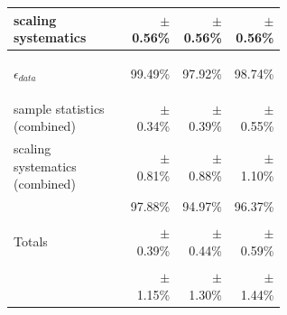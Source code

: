 \documentclass[landscape]{article}
\begin{document}
\begin{center}
\begin{tabular}{p{0.6\linewidth} r r r r}
    scaling systematics & & $\pm$ 0.56\% & $\pm$ 0.56\% & $\pm$ 0.56\% \\\hline
    \begin{minipage}{\linewidth} \begin{center} $\epsilon_{data}$ \end{center} \end{minipage} & & 99.49\% & 97.92\% & 98.74\% \\
    sample statistics (combined) & & $\pm$ 0.34\% & $\pm$ 0.39\% & $\pm$ 0.55\% \\
    scaling systematics (combined) & & $\pm$ 0.81\% & $\pm$ 0.88\% & $\pm$ 1.10\% \\\hline\hline
    & & 97.88\% & 94.97\% & 96.37\% \\
    \begin{minipage}{\linewidth} \begin{center} Totals \end{center} \end{minipage} & & $\pm$ 0.39\% & $\pm$ 0.44\% & $\pm$ 0.59\% \\
    & & $\pm$ 1.15\% & $\pm$ 1.30\% & $\pm$ 1.44\% \\
  \end{tabular}
\end{center}
\end{document}
